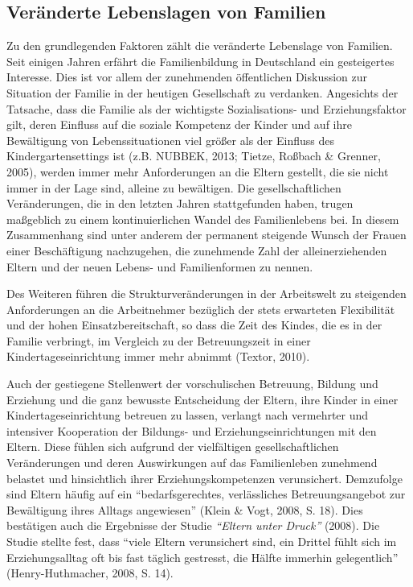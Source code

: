 \documentclass[12pt,a4paper]{article}
\begin{document}
\subsection{Veränderte Lebenslagen von Familien}
Zu den grundlegenden Faktoren zählt die veränderte Lebenslage von Familien. Seit einigen Jahren erfährt die Familienbildung in Deutschland ein gesteigertes Interesse. Dies ist vor allem der zunehmenden öffentlichen Diskussion zur Situation der Familie in der heutigen Gesellschaft zu verdanken. Angesichts der Tatsache, dass die Familie als der wichtigste Sozialisations- und Erziehungsfaktor gilt, deren Einfluss auf die soziale Kompetenz der Kinder und auf ihre Bewältigung von Lebenssituationen viel größer als der Einfluss des Kindergartensettings ist (z.B. NUBBEK, 2013; Tietze, Roßbach \& Grenner, 2005), werden immer mehr Anforderungen an die Eltern gestellt, die sie nicht immer in der Lage sind, alleine zu bewältigen. Die gesellschaftlichen Veränderungen, die in den letzten Jahren stattgefunden haben, trugen maßgeblich zu einem kontinuierlichen Wandel des Familienlebens bei. In diesem Zusammenhang sind unter anderem der permanent steigende Wunsch der Frauen einer Beschäftigung nachzugehen, die zunehmende Zahl der alleinerziehenden Eltern und der neuen Lebens- und Familienformen zu nennen.

Des Weiteren führen die Strukturveränderungen in der Arbeitswelt zu steigenden Anforderungen an die Arbeitnehmer bezüglich der stets erwarteten Flexibilität und der hohen Einsatzbereitschaft, so dass die Zeit des Kindes, die es in der Familie verbringt, im Vergleich zu der Betreuungszeit in einer Kindertageseinrichtung immer mehr abnimmt (Textor, 2010).	

Auch der gestiegene Stellenwert der vorschulischen Betreuung, Bildung und Erziehung und die ganz bewusste Entscheidung der Eltern, ihre Kinder in einer Kindertageseinrichtung betreuen zu lassen, verlangt nach vermehrter und intensiver Kooperation der Bildungs- und Erziehungseinrichtungen mit den Eltern. Diese fühlen sich aufgrund der vielfältigen gesellschaftlichen Veränderungen und deren Auswirkungen auf das Familienleben zunehmend belastet und hinsichtlich ihrer Erziehungskompetenzen verunsichert. Demzufolge sind Eltern häufig auf ein "`bedarfsgerechtes, verlässliches Betreuungsangebot zur Bewältigung ihres Alltags angewiesen"' (Klein \& Vogt, 2008, S. 18). Dies bestätigen auch die Ergebnisse der Studie \textit{"`Eltern unter Druck"'} (2008). Die Studie stellte fest, dass "`viele Eltern verunsichert sind, ein Drittel fühlt sich im Erziehungsalltag oft bis fast täglich gestresst, die Hälfte immerhin gelegentlich"' (Henry-Huthmacher, 2008, S. 14).
\end{document}

